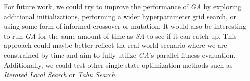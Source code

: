 For future work, we could try to improve the performance of \textit{GA} by exploring additional initializations, performing a wider hyperparameter grid search, or using some form of informed crossover or mutation. It would also be interesting to run \textit{GA} for the same amount of time as \textit{SA} to see if it can catch up. This approach could maybe better reflect the real-world scenario where we are constrained by time and aim to fully utilize \textit{GA}'s parallel fitness evaluation.
Additionally, we could test other single-state optimization methods such as \textit{Iterated Local Search} or \textit{Tabu Search}.
